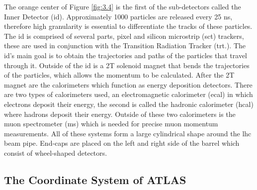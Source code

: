The orange center of Figure \ref{fig:3.4} is the first of the sub-detectors called the Inner Detector (\gls{id}). Approximately 1000 particles are released every 25 ns, therefore high granularity is essential to differentiate the tracks of these particles. The \gls{id} is comprised 
of several parts, pixel and silicon microstrip (\gls{sct}) trackers, these are used in conjunction with the Transition Radiation Tracker (\gls{trt}.).
The \gls{id}'s main goal is to obtain the trajectories and paths of the particles that travel through it. Outside of the \gls{id} is a 
2T solenoid magnet that bends the trajectories of the particles, which allows the momentum to be calculated. After the 2T magnet are the 
calorimeters which function as energy deposition detectors. There are two types of calorimeters used, an electromagnetic calorimeter (\gls{ecal})
in which electrons deposit their energy, the second is called the hadronic calorimeter (\gls{hcal}) where hadrons deposit their energy.
Outside of these two calorimeters is the muon spectrometer (\gls{ms}) which is needed for precise muon momentum measurements. All of these systems 
form a large cylindrical shape around the \gls{lhc} beam pipe. End-caps are placed on the left and right side of the barrel which consist 
of wheel-shaped detectors.

\subsection{The Coordinate System of ATLAS}
\par

